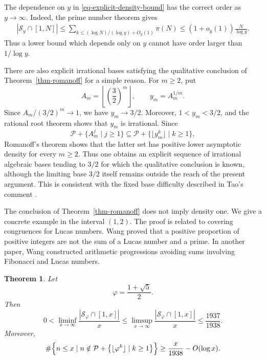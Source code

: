 \documentclass[11pt,reqno]{amsart}
\numberwithin{equation}{section}
\newtheorem{theorem}{Theorem}[section]
\begin{document}
    The dependence on $y$ in \eqref{eq-explicit-density-bound} has the correct order as $y\to\infty$. Indeed, the prime number theorem \cite[Ch.~14]{Apostol} gives
    $$
    \begin{aligned}
        \left|\mathcal{S}_y\cap[1,N]\right|
        \le \sum_{k\le (\log N)/(\log y)+O_y(1)}\pi(N)\le (1+o_y(1))\frac{N}{\log y}.
    \end{aligned}
    $$
    Thus a lower bound which depends only on $y$ cannot have order larger than $1/\log y$.

    There are also explicit irrational bases satisfying the qualitative conclusion of Theorem~\ref{thm-romanoff} for a simple reason. For $m\ge2$, put
    $$
    A_m=\left\lfloor\left(\frac32\right)^m\right\rfloor,
    \qquad
    y_m=A_m^{1/m}.
    $$
    Since $A_m/(3/2)^m\to1$, we have $y_m\to3/2$. Moreover, $1<y_m<3/2$, and the rational root theorem shows that $y_m$ is irrational. Since
    $$
    \mathcal{P}+\{A_m^j\mid j\ge1\}
    \subseteq
    \mathcal{P}+\{\lfloor y_m^k\rfloor\mid k\ge1\},
    $$
    Romanoff's theorem shows that the latter set has positive lower asymptotic density for every $m\ge2$. Thus one obtains an explicit sequence of irrational algebraic bases tending to $3/2$ for which the qualitative conclusion is known, although the limiting base $3/2$ itself remains outside the reach of the present argument. This is consistent with the fixed base difficulty described in Tao's comment \cite{Tao244}.

    The conclusion of Theorem~\ref{thm-romanoff} does not imply density one. We give a concrete example in the interval $(1,2)$. The proof is related to covering congruences for Lucas numbers. Wang \cite{WangLucas} proved that a positive proportion of positive integers are not the sum of a Lucas number and a prime. In another paper, Wang \cite{WangAP} constructed arithmetic progressions avoiding sums involving Fibonacci and Lucas numbers.

    \begin{theorem}\label{thm-golden-obstruction}
        Let
        $$
        \varphi=\frac{1+\sqrt5}{2}.
        $$
        Then
        $$
        0<
        \liminf_{x\to\infty}
        \frac{\left|\mathcal{S}_\varphi\cap[1,x]\right|}{x}
        \le
        \limsup_{x\to\infty}
        \frac{\left|\mathcal{S}_\varphi\cap[1,x]\right|}{x}
        \le \frac{1937}{1938}.
        $$
        Moreover,
        $$
        \#\Bigl\{n\le x\mid n\notin \mathcal{P}+\bigl\{\lfloor \varphi^k\rfloor\mid k\ge1\bigr\}\Bigr\}
        \ge \frac{x}{1938}-O(\log x).
        $$
    \end{theorem}
\end{document}
